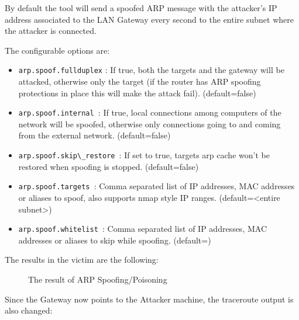 \documentclass[status=normal,cover=tesi,language=en]{gmeepd}
\begin{document}
By default the tool will send a spoofed ARP message with the attacker's IP address associated to the LAN Gateway every second to the entire subnet where the attacker is connected.

The configurable options are\cite{arp-poof-source-code}:

\begin{itemize}
 \item  \verb|arp.spoof.fullduplex| : If true, both the targets and the gateway will be attacked, otherwise only the target (if the router has ARP spoofing protections in place this will make the attack fail). (default=false)
 \item     \verb|arp.spoof.internal |: If true, local connections among computers of the network will be spoofed, otherwise only connections going to and coming from the external network. (default=false)
 \item \verb|arp.spoof.skip\_restore |: If set to true, targets arp cache won't be restored when spoofing is stopped. (default=false)
 \item      \verb|arp.spoof.targets |: Comma separated list of IP addresses, MAC addresses or aliases to spoof, also supports nmap style IP ranges. (default=<entire subnet>)
 \item    \verb|arp.spoof.whitelist |: Comma separated list of IP addresses, MAC addresses or aliases to skip while spoofing. (default=)
\end{itemize}

The results in the victim are the following:

\begin{figure}[!hb]
\centering
 \vspace{0.5cm}
 \caption{The result of ARP Spoofing/Poisoning}\label{fig: spoof-before-after}
\end{figure}

\pagebreak

Since the Gateway now points to the Attacker machine, the traceroute output is also changed:
\end{document}
